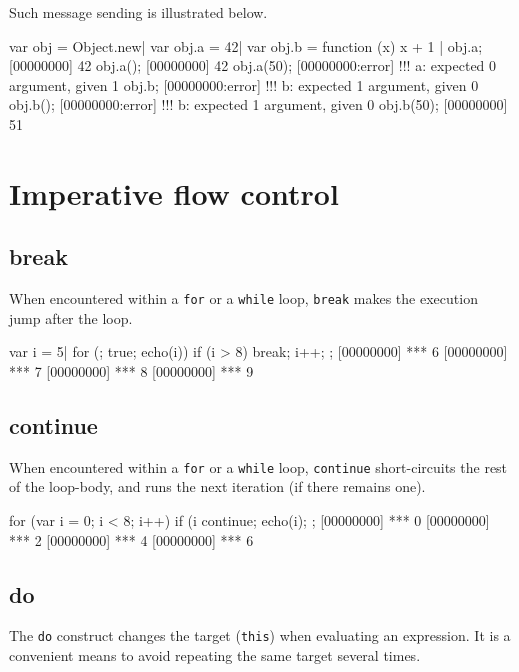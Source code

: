 Such message sending is illustrated below.

\begin{urbiscript}[firstnumber=last]
var obj = Object.new|
var obj.a = 42|
var obj.b = function (x) { x + 1 }|
obj.a;
[00000000] 42
obj.a();
[00000000] 42
obj.a(50);
[00000000:error] !!! a: expected 0 argument, given 1
obj.b;
[00000000:error] !!! b: expected 1 argument, given 0
obj.b();
[00000000:error] !!! b: expected 1 argument, given 0
obj.b(50);
[00000000] 51
\end{urbiscript}

\section{Imperative flow control}

\subsection{break}

When encountered within a \lstinline|for| or a \lstinline|while| loop,
\lstinline|break| makes the execution jump after the loop.

\begin{urbiscript}[firstnumber=last]
var i = 5|
for (; true; echo(i))
{
  if (i > 8)
    break;
  i++;
};
[00000000] *** 6
[00000000] *** 7
[00000000] *** 8
[00000000] *** 9
\end{urbiscript}

\subsection{continue}

When encountered within a \lstinline|for| or a \lstinline|while| loop,
\lstinline|continue| short-circuits the rest of the loop-body, and
runs the next iteration (if there remains one).

\begin{urbiscript}[firstnumber=last]
for (var i = 0; i < 8; i++)
{
  if (i %
    continue;
  echo(i);
};
[00000000] *** 0
[00000000] *** 2
[00000000] *** 4
[00000000] *** 6
\end{urbiscript}

\subsection{do}

The \lstinline|do| construct changes the target (\lstinline|this|)
when evaluating an expression.  It is a convenient means to avoid
repeating the same target several times.

